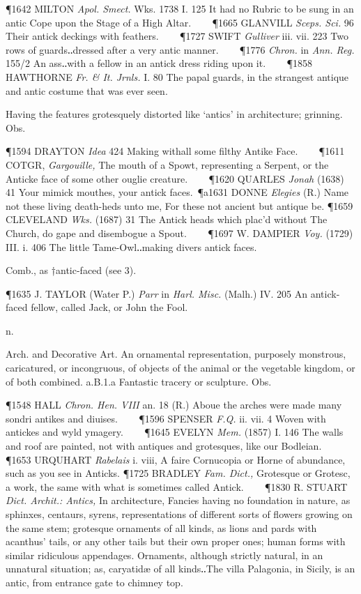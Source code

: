 \begin{description}[wide, labelwidth=!, labelindent=0pt]
\begin{myenumerate}
\P 1642 MILTON \textit{Apol. Smect.} Wks. 1738 I. 125 It had no Rubric to be sung in an
antic Cope upon the Stage of a High Altar.    
\P 1665 GLANVILL \textit{Sceps. Sci.} 96 Their antick deckings with feathers.    
\P 1727 SWIFT \textit{Gulliver} iii. vii. 223 Two rows of guards‥dressed after a very antic manner.    
\P 1776 \textit{Chron.} in \textit{Ann. Reg.} 155/2 An ass‥with a fellow in an antick dress riding upon it.    
\P 1858 HAWTHORNE \textit{Fr. \& It. Jrnls.} I. 80 The papal guards, in the strangest 
antique and antic costume that was ever seen.

 Having the features grotesquely distorted like ‘antics’ in architecture;
grinning. Obs. 

\P 1594 DRAYTON \textit{Idea} 424 Making withall some filthy Antike Face.    
\P 1611 COTGR, \textit{Gargouille,} The mouth of a Spowt, representing a Serpent, or the Anticke face of
some other ouglie creature.    
\P 1620 QUARLES \textit{Jonah} (1638) 41 Your mimick mouthes,
your antick faces. 
\P a1631 DONNE \textit{Elegies} (R.) Name not these living death-heds
unto me, For these not ancient but antique be.
\P 1659 CLEVELAND \textit{Wks.} (1687)
31 The Antick heads which plac'd without The Church, do gape and disembogue a
Spout.    
\P 1697 W. DAMPIER \textit{Voy.} (1729) III. i. 406 The little Tame-Owl‥making
divers antick faces.

 Comb., as †antic-faced (see 3). 

\P 1635 J. TAYLOR (Water P.) \textit{Parr} in \textit{Harl. Misc.} (Malh.) IV. 205 An antick-faced
fellow, called Jack, or John the Fool.

 n. 

 Arch. and Decorative Art. An ornamental representation, purposely
monstrous, caricatured, or incongruous, of objects of the animal or the
vegetable kingdom, or of both combined. a.B.1.a Fantastic tracery or sculpture.
Obs. 

\P 1548 HALL \textit{Chron. Hen. VIII} an. 18 (R.) Aboue the arches were made many sondri
antikes and diuises.    
\P 1596 SPENSER \textit{F.Q.} ii. vii. 4 Woven with antickes and
wyld ymagery.    
\P 1645 EVELYN \textit{Mem.} (1857) I. 146 The walls and roof are painted,
not with antiques and grotesques, like our Bodleian.    
\P 1653 URQUHART \textit{Rabelais}
i. viii, A faire Cornucopia or Horne of abundance, such as you see in Anticks.
\P 1725 BRADLEY \textit{Fam. Dict.,} Grotesque or Grotesc, a work, the same with what is
sometimes called Antick.    
\P 1830 R. STUART \textit{Dict. Archit.: Antics,} In
architecture, Fancies having no foundation in nature, as sphinxes, centaurs,
syrens, representations of different sorts of flowers growing on the same stem;
grotesque ornaments of all kinds, as lions and pards with acanthus' tails, or
any other tails but their own proper ones; human forms with similar ridiculous
appendages. Ornaments, although strictly natural, in an unnatural situation; as,
caryatidæ of all kinds‥The villa Palagonia, in Sicily, is an antic, from
entrance gate to chimney top.


\end{myenumerate}
\end{description}
